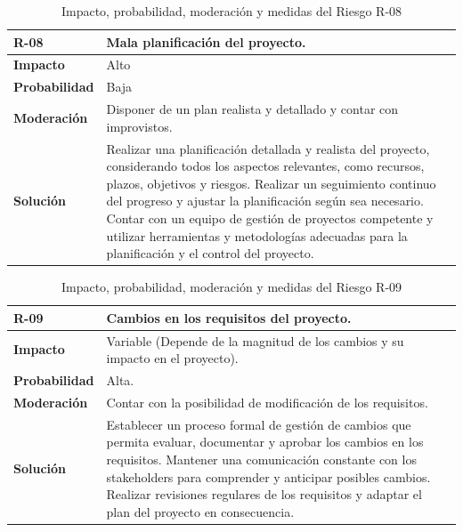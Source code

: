 \begin{table}[htbp]
\begin{center}
\begin{tabular}{|l|p{12cm}|}
\hline
\textbf{R-08} & Mala planificación del proyecto. \\ \hline
\textbf{Impacto} & Alto \\ \hline
\textbf{Probabilidad} & Baja \\ \hline
\textbf{Moderación} & Disponer de un plan realista y detallado y contar con improvistos. \\ \hline
\textbf{Solución} & Realizar una planificación detallada y realista del proyecto, considerando todos los aspectos relevantes, como recursos, plazos, objetivos y riesgos. Realizar un seguimiento continuo del progreso y ajustar la planificación según sea necesario. Contar con un equipo de gestión de proyectos competente y utilizar herramientas y metodologías adecuadas para la planificación y el control del proyecto.\\ \hline
\end{tabular}
\caption[Riesgo R-08]{Impacto, probabilidad, moderación y medidas del Riesgo R-08}
\label{tabla:r-08}
\end{center}
\end{table}

\begin{table}[htbp]
\begin{center}
\begin{tabular}{|l|p{12cm}|}
\hline
\textbf{R-09} & Cambios en los requisitos del proyecto. \\ \hline
\textbf{Impacto} & Variable (Depende de la magnitud de los cambios y su impacto en el proyecto). \\ \hline
\textbf{Probabilidad} & Alta. \\ \hline
\textbf{Moderación} & Contar con la posibilidad de modificación de los requisitos.\\ \hline
\textbf{Solución} & Establecer un proceso formal de gestión de cambios que permita evaluar, documentar y aprobar los cambios en los requisitos. Mantener una comunicación constante con los stakeholders para comprender y anticipar posibles cambios. Realizar revisiones regulares de los requisitos y adaptar el plan del proyecto en consecuencia.\\ \hline
\end{tabular}
\caption[Riesgo R-09]{Impacto, probabilidad, moderación y medidas del Riesgo R-09}
\label{tabla:r-09}
\end{center}
\end{table}

